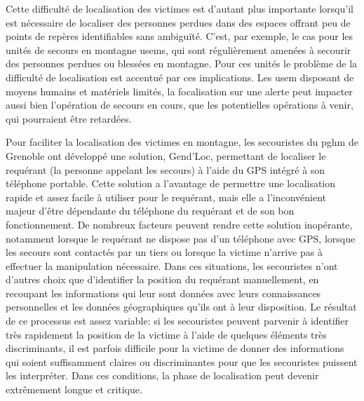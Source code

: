 

Cette difficulté de localisation des victimes est d'autant plus
importante lorsqu'il est nécessaire de localiser des personnes perdues
dans des espaces offrant peu de points de repères identifiables sans
ambiguïté. C'est, par exemple, le cas pour les unités de secours en
montagne \acp{usem}, qui sont régulièrement amenées à secourir des
personnes perdues ou blessées en montagne. Pour ces unités le
problème de la difficulté de localisation est accentué par ces
implications. Les \ac{usem} disposant de moyens humains et matériels
limités, la focalisation sur une alerte peut impacter aussi bien
l'opération de secours en cours, que les potentielles opérations à
venir, qui pourraient être retardées.

Pour faciliter la localisation des victimes en montagne, les
secouristes du \ac{pghm} de Grenoble ont développé une solution,
Gend'Loc, permettant de localiser le requérant (\ie la personne
appelant les secours) à l'aide du GPS intégré à son téléphone
portable. Cette solution a l'avantage de permettre une localisation
rapide et assez facile à utiliser pour le requérant, mais elle a
l'inconvénient majeur d'être dépendante du téléphone du requérant et
de son bon fonctionnement. De nombreux facteurs peuvent rendre cette
solution inopérante, notamment lorsque le requérant ne dispose pas
d'un téléphone avec GPS, lorsque les secours sont contactés par un
tiers ou lorsque la victime n'arrive pas à effectuer la manipulation
nécessaire. Dans ces situations, les secouristes n'ont d'autres choix
que d'identifier la position du requérant manuellement, en recoupant
les informations qui leur sont données avec leurs connaissances
personnelles et les données géographiques qu'ils ont à leur
disposition. Le résultat de ce processus est assez variable: si les
secouristes peuvent parvenir à identifier très rapidement la position
de la victime à l'aide de quelques éléments très discriminants, il est
parfois difficile pour la victime de donner des informations qui
soient suffisamment claires ou discriminantes pour que les secouristes
puissent les interpréter. Dans ces conditions, la phase de
localisation peut devenir extrêmement longue et critique.

